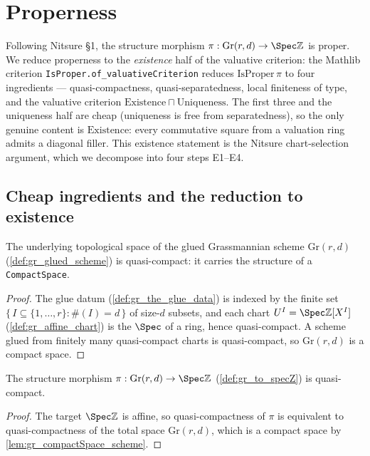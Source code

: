 \section{Properness}
\label{sec:gr_proper}

Following Nitsure \S 1, the structure morphism \(\pi : \mathrm{Gr}(r,d) \to \Spec
\mathbb{Z}\) is proper. We reduce properness to the \emph{existence} half of the
valuative criterion: the Mathlib criterion \texttt{IsProper.of\_valuativeCriterion}
reduces \(\mathrm{IsProper}\,\pi\) to four ingredients --- quasi-compactness,
quasi-separatedness, local finiteness of type, and the valuative criterion
\(\mathrm{Existence} \sqcap \mathrm{Uniqueness}\). The first three and the
uniqueness half are cheap (uniqueness is free from separatedness), so the only
genuine content is \(\mathrm{Existence}\): every commutative square from a
valuation ring admits a diagonal filler. This existence statement is the Nitsure
chart-selection argument, which we decompose into four steps E1--E4.

\subsection*{Cheap ingredients and the reduction to existence}

\begin{lemma}\leanok
  \label{lem:gr_compactSpace_scheme}
  The underlying topological space of the glued Grassmannian scheme
  \(\mathrm{Gr}(r,d)\) (\cref{def:gr_glued_scheme}) is quasi-compact: it carries the
  structure of a \texttt{CompactSpace}.
\end{lemma}
\begin{proof}
  \leanok
  The glue datum (\cref{def:gr_the_glue_data}) is indexed by the finite set
  \(\{\, I \subseteq \{1,\dots,r\} : \#(I) = d \,\}\) of size-\(d\) subsets, and
  each chart \(U^I = \Spec \mathbb{Z}[X^I]\) (\cref{def:gr_affine_chart}) is the
  \(\Spec\) of a ring, hence quasi-compact. A scheme glued from finitely many
  quasi-compact charts is quasi-compact, so \(\mathrm{Gr}(r,d)\) is a compact
  space.
\end{proof}

\begin{lemma}\leanok
  \label{lem:gr_quasiCompact_toSpecZ}
  The structure morphism \(\pi : \mathrm{Gr}(r,d) \to \Spec \mathbb{Z}\)
  (\cref{def:gr_to_specZ}) is quasi-compact.
\end{lemma}
\begin{proof}
  \leanok
  The target \(\Spec \mathbb{Z}\) is affine, so quasi-compactness of \(\pi\) is
  equivalent to quasi-compactness of the total space \(\mathrm{Gr}(r,d)\), which is
  a compact space by \cref{lem:gr_compactSpace_scheme}.
\end{proof}

